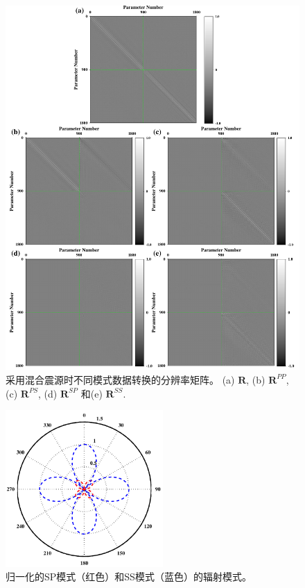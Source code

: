 \begin{figure}[!htb]
    \begin{center}
        \includegraphics[width=12cm]{Figure/chapter02/ResoOpera/Fig/resolutionMN.pdf}
        \caption{
			采用混合震源时不同模式数据转换的分辨率矩阵。
            (a) $\mathbf{R}$, (b) $\mathbf{R}^{PP}$, (c) $\mathbf{R}^{PS}$, (d)
            $\mathbf{R}^{SP}$ 和(e)
            $\mathbf{R}^{SS}$.
    }
    \label{fig:ResoMN}
    \end{center}
\end{figure}

\begin{figure}[!htb]
    \begin{center}
        \includegraphics[width=6cm]{Figure/chapter02/radiationpattern/Fig/SPSS.pdf}
        \caption{
			归一化的SP模式（红色）和SS模式（蓝色）的辐射模式。
    }
    \label{fig:SPSS}
    \end{center}
\end{figure}
